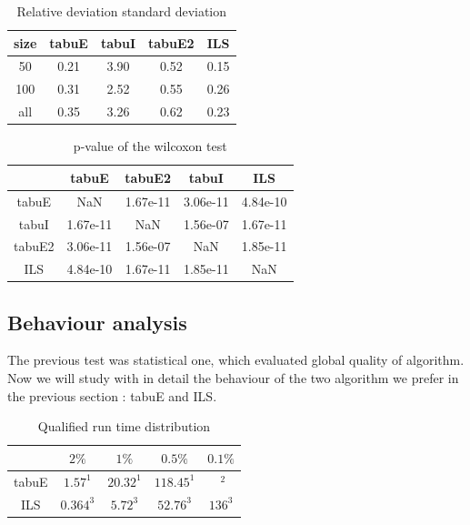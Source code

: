\documentclass[12pt,a4paper]{article}
\begin{document}
\begin{table}[!h]
\centering
\begin{tabular}{|*{5}{c|}}
  \hline
  size & tabuE & tabuI & tabuE2 & ILS\\
  \hline
  50 & 0.21 & 3.90 & 0.52 & 0.15 \\ 
  100 & 0.31 & 2.52 & 0.55 & 0.26 \\
  all & 0.35 & 3.26 & 0.62 & 0.23 \\
  \hline
\end{tabular}
\caption{Relative deviation standard deviation}
\label{Relative deviation standard deviation}
\end{table}

\begin{table}[!h]
\centering
\begin{tabular}{|*{5}{c|}}
  \hline
  ~ & tabuE & tabuE2 & tabuI & ILS\\
  \hline
tabuE & NaN & 1.67e-11 & 3.06e-11 & 4.84e-10 \\
tabuI & 1.67e-11 & NaN & 1.56e-07 & 1.67e-11 \\
tabuE2 & 3.06e-11 & 1.56e-07 & NaN & 1.85e-11 \\
ILS & 4.84e-10 & 1.67e-11 & 1.85e-11 & NaN \\
  \hline
\end{tabular}
\caption{p-value of the wilcoxon test}
\label{p-value of the wilcoxon test}
\end{table}


\subsection{Behaviour analysis}

The previous test was statistical one, which evaluated global quality of algorithm. Now we will study with in detail the behaviour of the two algorithm we prefer in the previous section : tabuE and ILS.

\begin{table}[!h]
\centering
\begin{tabular}{|*{5}{c|}}
  \hline
  ~ & $2\%$ & $1\%$ & $0.5\%$ & $0.1\%$ \\
  \hline
   tabuE & $1.57^1$ & $20.32^1$ & $118.45^1$ & $\text{~}^2$ \\ 
   ILS & $0.364^3$ & $5.72^3$ & $52.76^3$ & $136^3$ \\
  \hline
\end{tabular}
\caption{Qualified run time distribution}
\label{Average qualified run time distribution}
\end{table}
\end{document}
